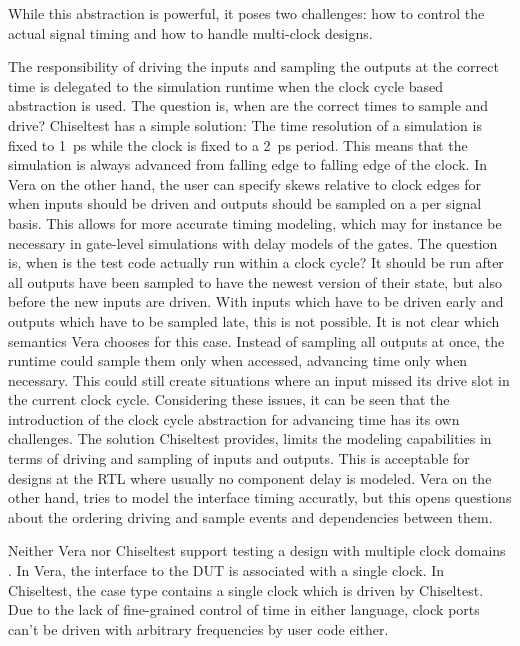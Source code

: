 While this abstraction is powerful, it poses two challenges: how to control the actual signal timing and how to
handle multi-clock designs.

The responsibility of driving the inputs and sampling the outputs at the correct time is delegated to the simulation
runtime when the clock cycle based abstraction is used. The question is, when are the correct times to sample and
drive? Chiseltest has a simple solution: The time resolution of a simulation is fixed to \SI{1}{ps} while the clock
is fixed to a \SI{2}{ps} period. This means that the simulation is always advanced from falling edge to falling edge
of the clock. In Vera on the other hand, the user can specify skews relative to clock edges for when inputs should be
driven and outputs should be sampled on a per signal basis. This allows for more accurate timing modeling, which may
for instance be necessary in gate-level simulations with delay models of the gates. The question is, when is the test
code actually run within a clock cycle? It should be run after all outputs have been sampled to have the newest
version of their state, but also before the new inputs are driven. With inputs which have to be driven early and
outputs which have to be sampled late, this is not possible. It is not clear which semantics Vera chooses for this
case. Instead of sampling all outputs at once, the runtime could sample them only when accessed, advancing time only
when necessary. This could still create situations where an input missed its drive slot in the current clock cycle.
Considering these issues, it can be seen that the introduction of the clock cycle abstraction for advancing time has
its own challenges. The solution Chiseltest provides, limits the modeling capabilities in terms of driving and
sampling of inputs and outputs. This is acceptable for designs at the RTL where usually no component delay is
modeled. Vera on the other hand, tries to model the interface timing accuratly, but this opens questions about the
ordering driving and sample events and dependencies between them.

Neither Vera nor Chiseltest support testing a design with multiple clock domains \cite[Sec.
7]{flake2020a}\cite{chiseltest_multiclock}. In Vera, the interface to the DUT is associated with a single clock. In
Chiseltest, the  case type contains a single clock which is driven by Chiseltest. Due to the lack of
fine-grained control of time in either language, clock ports can't be driven with arbitrary frequencies by user code either.

